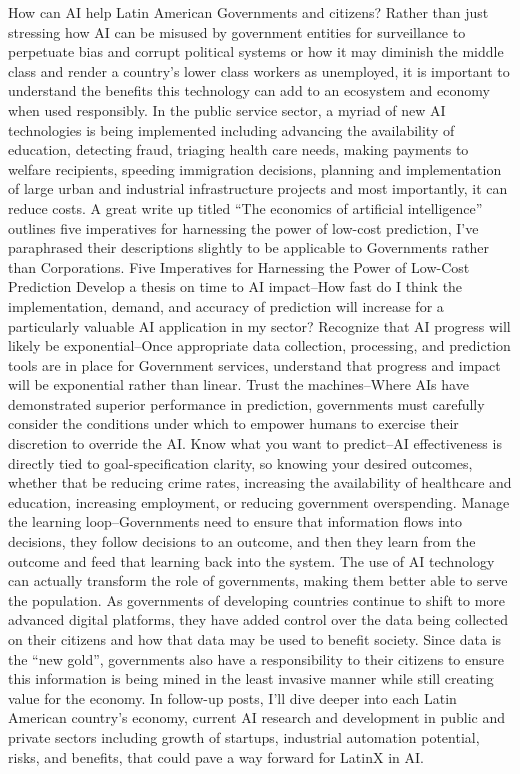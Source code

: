 \documentclass[journal]{IEEEtran}
\begin{document}
How can AI help Latin American Governments and citizens?
Rather than just stressing how AI can be misused by government entities for surveillance to perpetuate bias and corrupt political systems or how it may diminish the middle class and render a country’s lower class workers as unemployed, it is important to understand the benefits this technology can add to an ecosystem and economy when used responsibly.
In the public service sector, a myriad of new AI technologies is being implemented including advancing the availability of education, detecting fraud, triaging health care needs, making payments to welfare recipients, speeding immigration decisions, planning and implementation of large urban and industrial infrastructure projects and most importantly, it can reduce costs.
A great write up titled “The economics of artificial intelligence” outlines five imperatives for harnessing the power of low-cost prediction, I’ve paraphrased their descriptions slightly to be applicable to Governments rather than Corporations.
Five Imperatives for Harnessing the Power of Low-Cost Prediction
Develop a thesis on time to AI impact--How fast do I think the implementation, demand, and accuracy of prediction will increase for a particularly valuable AI application in my sector?
Recognize that AI progress will likely be exponential--Once appropriate data collection, processing, and prediction tools are in place for Government services, understand that progress and impact will be exponential rather than linear.
Trust the machines--Where AIs have demonstrated superior performance in prediction, governments must carefully consider the conditions under which to empower humans to exercise their discretion to override the AI.
Know what you want to predict--AI effectiveness is directly tied to goal-specification clarity, so knowing your desired outcomes, whether that be reducing crime rates, increasing the availability of healthcare and education, increasing employment, or reducing government overspending.
Manage the learning loop--Governments need to ensure that information flows into decisions, they follow decisions to an outcome, and then they learn from the outcome and feed that learning back into the system.
The use of AI technology can actually transform the role of governments, making them better able to serve the population. As governments of developing countries continue to shift to more advanced digital platforms, they have added control over the data being collected on their citizens and how that data may be used to benefit society. Since data is the “new gold”, governments also have a responsibility to their citizens to ensure this information is being mined in the least invasive manner while still creating value for the economy.
In follow-up posts, I’ll dive deeper into each Latin American country’s economy, current AI research and development in public and private sectors including growth of startups, industrial automation potential, risks, and benefits, that could pave a way forward for LatinX in AI.
\end{document}
